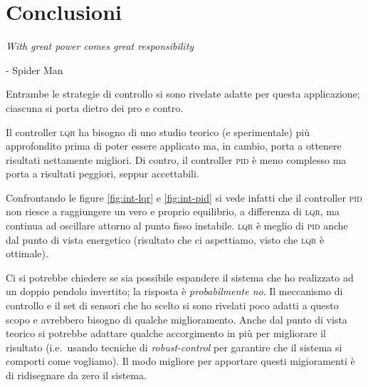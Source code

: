 \section{Conclusioni}\label{sec:conclusioni}
\begin{framed}
  \begin{flushleft}
  \emph{With great power comes great responsibility}
  \end{flushleft}
  \begin{flushright}
    - Spider Man
  \end{flushright}
\end{framed}

Entrambe le strategie di controllo si sono rivelate adatte per questa applicazione;
ciascuna si porta dietro dei pro e contro.

Il controller \textsc{lqr} ha bisogno di uno studio teorico (e sperimentale) più approfondito prima di poter essere
applicato ma, in cambio, porta a ottenere risultati nettamente migliori.
Di contro, il controller \textsc{pid} è meno complesso ma porta a risultati peggiori, seppur accettabili.

Confrontando le figure \ref{fig:int-lqr} e \ref{fig:int-pid} si vede infatti che il controller \textsc{pid} non riesce
a raggiungere un vero e proprio equilibrio, a differenza di \textsc{lqr}, ma continua ad oscillare attorno al punto
fisso instabile.
\textsc{lqr} è meglio di \textsc{pid} anche dal punto di vista energetico (risultato che ci aspettiamo, visto che \textsc{lqr} è
ottimale).

Ci si potrebbe chiedere se sia possibile espandere il sistema che ho realizzato ad un doppio pendolo invertito;
la risposta è \emph{probabilmente no}.
Il meccanismo di controllo e il set di sensori che ho scelto si sono rivelati poco adatti a questo scopo e avrebbero
bisogno di qualche miglioramento.
Anche dal punto di vista teorico si potrebbe adattare qualche accorgimento in più per migliorare il risultato (i.e.\ usando
tecniche di \emph{robust-control} per garantire che il sistema si comporti come vogliamo).
Il modo migliore per apportare questi migioramenti è di ridisegnare da zero il sistema.
